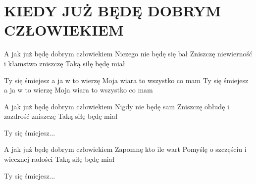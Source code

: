 \documentclass[../../../songbook.tex]{subfiles}
\begin{document}
\TabPositions{8cm} %
\section*{KIEDY JUŻ BĘDĘ DOBRYM CZŁOWIEKIEM}
{}
\vspace{0.5cm}
A jak już będę dobrym człowiekiem				 \newline
Niczego nie będę się bał						 \newline
Zniszczę niewierność i kłamstwo zniszczę		 \newline
Taką siłę będę miał								 \newline

\-\hspace{1cm} Ty się śmiejesz a ja w to wierzę	 \newline
\-\hspace{1cm} Moja wiara to wszystko co mam       \newline
\-\hspace{1cm} Ty się śmiejesz a ja w to wierzę			 \newline
\-\hspace{1cm} Moja wiara to wszystko co mam			 \newline

A jak już będę dobrym człowiekiem			 \newline
Nigdy nie będę sam			 \newline
Zniszczę obłudę i zazdrość zniszczę			 \newline
Taką siłę będę miał			 \newline

\-\hspace{1cm} Ty się śmiejesz...			 \newline

A jak już będę dobrym człowiekiem			 \newline
Zapomnę kto ile wart			 \newline
Pomyślę o szczęściu i wiecznej radości			 \newline
Taką siłę będę miał			 \newline

\-\hspace{1cm} Ty się śmiejesz...			 \newline
\end{document}
